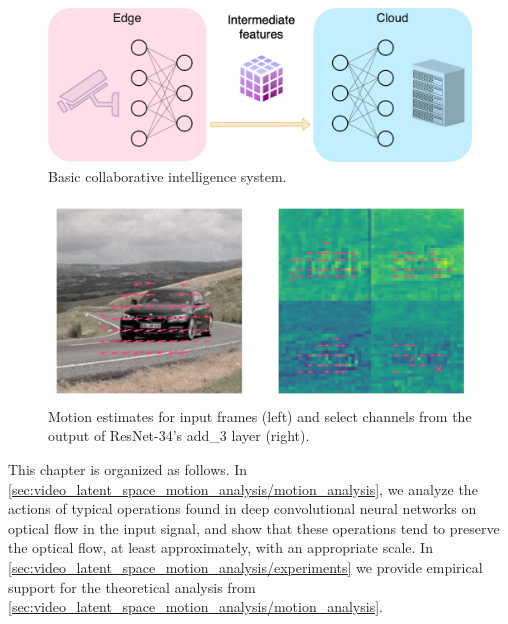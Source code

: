\begin{figure}[htbp]
    \centering
    \vspace{\baselineskip}%
    \includegraphics[width=\columnwidth]{img/video_latent_space_motion_analysis/CI_system.png}%
    \vspace{0.5\baselineskip}%
    \caption{Basic collaborative intelligence system.}
    \label{fig:video_latent_space_motion_analysis/CI_system}
\end{figure}

\begin{figure}[htbp]
    \centering
    \includegraphics[width=\columnwidth]{img/video_latent_space_motion_analysis/mv_car.png}
    \caption{%
        Motion estimates for input frames (left) and
        select channels from the output of ResNet-34's add\_3 layer (right).
    }
    \label{fig:video_latent_space_motion_analysis/mv_overview}
\end{figure}

This chapter is organized as follows. In \cref{sec:video_latent_space_motion_analysis/motion_analysis}, we analyze the actions of typical operations found in deep convolutional neural networks on optical flow in the input signal, and show that these operations tend to preserve the optical flow, at least approximately, with an appropriate scale. In \cref{sec:video_latent_space_motion_analysis/experiments} we provide empirical support for the theoretical analysis from \cref{sec:video_latent_space_motion_analysis/motion_analysis}. %


